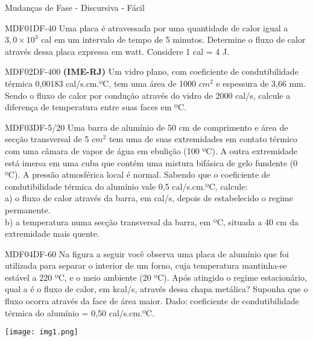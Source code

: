 \documentclass[12pt]{article}
\begin{document}
	\begin{quiz}{Mudanças de Fase - Discursiva - Fácil}
		\begin{essay}[points=2,penalty=0,response format=file,attachments allowed=1,attachments required=1]{MDF01DF-40}
			Uma placa é atravessada por uma quantidade de calor igual a $3,0\times10^{3}$ cal em um intervalo de tempo de 5 minutos. Determine o fluxo de calor através dessa placa expressa em watt. Considere 1 cal = 4 J.	
		\end{essay}	
		\begin{essay}[points=2,penalty=0,response format=file,attachments allowed=1,attachments required=1]{MDF02DF-400}
			\textbf{(IME-RJ)} Um vidro plano, com coeficiente de condutibilidade térmica 0,00183 cal/s.cm.ºC, tem uma área de 1000 $cm^{2}$  e espessura de 3,66 mm. Sendo o fluxo de calor por condução através do vidro de 2000 cal/s, calcule a diferença de temperatura entre suas faces em ºC.
		\end{essay}
		\begin{essay}[points=2,penalty=0,response format=file,attachments allowed=1,attachments required=1]{MDF03DF-5/20}
			Uma barra de alumínio de 50 cm de comprimento e área de secção transversal de 5 $cm^{2}$  tem uma de suas extremidades em contato térmico com uma câmara de vapor de água em ebulição (100 ºC).  A outra extremidade está imersa em uma cuba que contém uma mistura bifásica de gelo fundente (0 ºC). A pressão atmosférica local é normal. Sabendo que o coeficiente de condutibilidade térmica do alumínio vale 0,5 cal/s.cm.ºC, calcule:\\
			a) o fluxo de calor através da barra, em cal/s, depois de estabelecido o regime permanente.\\
			b) a temperatura numa secção transversal da barra, em ºC, situada a 40 cm da extremidade mais quente.			
		\end{essay}
		\begin{essay}[points=2,penalty=0,response format=file,attachments allowed=1,attachments required=1]{MDF04DF-60}
			Na figura a seguir você observa uma placa de alumínio que foi utilizada para separar o interior de um forno, cuja temperatura mantinha-se estável a 220 ºC, e o meio ambiente (20 ºC). Após atingido o regime estacionário, qual a é o fluxo de calor, em kcal/s, através dessa chapa metálica? Suponha que o fluxo ocorra através da face de área maior. Dado: coeficiente de condutibilidade térmica do alumínio = 0,50 cal/s.cm.ºC.
			\begin{center}
				\texttt{[image: img1.png]}			

\end{center}
\end{essay}
\end{quiz}
\end{document}
